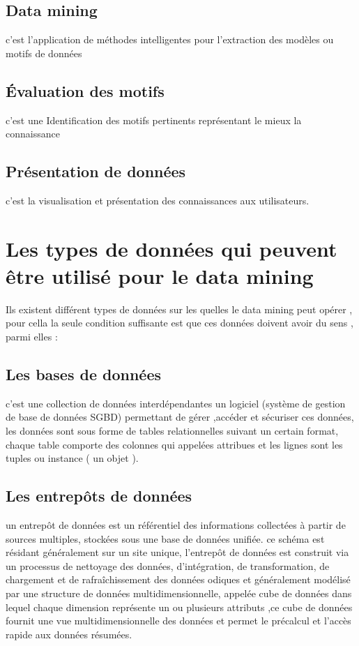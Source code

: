 \documentclass[12pt,a4paper,oneside]{book}
\begin{document}
	\subsection{Data mining}
	c'est l'application de méthodes intelligentes pour l'extraction des modèles ou motifs de données 
	\subsection{Évaluation des motifs}
	c'est une Identification des motifs pertinents représentant le mieux la connaissance
	
	\subsection{Présentation de données}
	c'est la visualisation et présentation des connaissances aux utilisateurs.
    \section{Les types de données qui peuvent être utilisé pour le data mining }
    Ils existent différent types de données sur les quelles le data mining peut opérer , pour cella la seule condition suffisante est que ces données doivent avoir du sens , parmi elles :
    \subsection{Les bases de données}
     c'est une collection de données interdépendantes  un logiciel  (système de gestion de base de données SGBD) permettant de gérer ,accéder et sécuriser ces données, les données sont sous forme de tables relationnelles  suivant un certain format, chaque table comporte des colonnes qui appelées attribues et les lignes sont les tuples  ou instance ( un objet ).
     
     
   \subsection{Les entrepôts de données}
   
   un entrepôt de données est un référentiel des informations collectées à partir de sources multiples, stockées sous une base de données unifiée.
   ce schéma est résidant généralement sur un site unique, l'entrepôt de données est construit via un processus de nettoyage des données, d’intégration, de transformation, de chargement et de
   rafraîchissement des données odiques et généralement modélisé par une structure de données multidimensionnelle, appelée
   cube de données
   dans lequel chaque
   dimension représente un ou plusieurs attributs ,ce cube de données fournit une vue multidimensionnelle des données et permet
   le précalcul et l'accès rapide aux données résumées.
\end{document}
